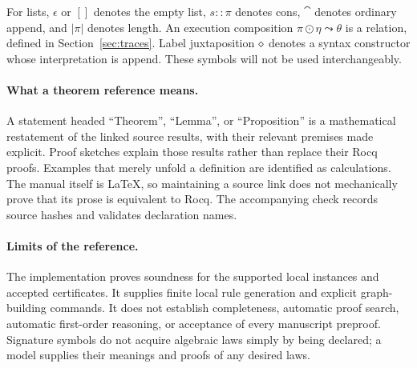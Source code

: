 For lists, $\epsilon$ or $[]$ denotes the empty list, $s::\pi$ denotes cons,
$\cat$ denotes ordinary append, and $|\pi|$ denotes length. An execution
composition $\pi\odot\eta\leadsto\theta$ is a relation, defined in
Section~\ref{sec:traces}. Label juxtaposition $\mathbin{\diamond}$ denotes a syntax
constructor whose interpretation is append. These symbols will not be used
interchangeably.

\paragraph{What a theorem reference means.}
A statement headed ``Theorem'', ``Lemma'', or ``Proposition'' is a
mathematical restatement of the linked source results, with their relevant
premises made explicit. Proof sketches explain those results rather than
replace their Rocq proofs. Examples that merely unfold a definition are
identified as calculations. The manual itself is LaTeX, so maintaining a
source link does not mechanically prove that its prose is equivalent to Rocq.
The accompanying check records source hashes and validates declaration names.

\paragraph{Limits of the reference.}
The implementation proves soundness for the supported local instances and
accepted certificates. It supplies finite local rule generation and explicit
graph-building commands. It does not establish completeness, automatic proof
search, automatic first-order reasoning, or acceptance of every manuscript
preproof. Signature symbols do not acquire algebraic laws simply by being
declared; a model supplies their meanings and proofs of any desired laws.

